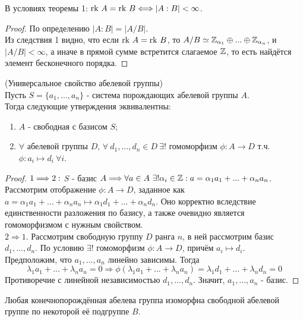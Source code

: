\begin{consequensenum}
    В условиях теоремы 1: $\textup{rk } A = \textup{rk } B \Longleftrightarrow |A : B| < \infty$.
\end{consequensenum}
\begin{proof}
    По определению $|A : B| = |A/B|$. \\
    Из следствия 1 видно, что если $\textup{rk } A = \textup{rk } B$, то $A/B \simeq \mathbb{Z}_{\alpha_1} \oplus ... \oplus \mathbb{Z}_{\alpha_n}$, и $|A/B| < \infty$, а иначе в прямой сумме встретится слагаемое $\mathbb{Z}$, то есть найдётся элемент бесконечного порядка.
\end{proof}
\begin{subtheoremnum}(Универсальное свойство абелевой группы)\\
    Пусть $S = \{a_1,...,a_n\}$ - система порождающих абелевой группы $A$.\\
    Тогда следующие утверждения эквивалентны:
    \begin{enumerate}
        \item $A$ - свободная с базисом $S$;
        \item $\forall$ абелевой группы $D$, $\forall \ d_1,...,d_n \in D \ \exists!$ гомоморфизм $\phi: A\rightarrow D$ т.ч. $\phi: a_i \mapsto d_i \  \forall i$. 
    \end{enumerate} 
\end{subtheoremnum}
\begin{proof}
    $ \\ 1 \Longrightarrow 2:$  $S$ - базис $A \Longrightarrow \forall a \in A \ \exists! \alpha_i  \in \Z : a = \alpha_1a_1 + ... + \alpha_na_n$.\\
    Рассмотрим отображение $\phi: A \rightarrow D$, заданное как $a = \alpha_1a_1 + ... + \alpha_na_n \mapsto \alpha_1d_1 + ... + \alpha_nd_n$. Оно корректно вследствие единственности разложения по базису, а также очевидно является гомоморфизмом с нужным свойством.\\
    $2 \Longrightarrow 1$. Рассмотрим свободную группу $D$ ранга $n$, в ней рассмотрим базис $d_1,...,d_n$. По условию $\exists!$ гомоморфизм $\phi: A \rightarrow D$, причём $a_i \mapsto d_i$.\\
    Предположим, что $a_1,...,a_n$ линейно зависимы. Тогда \[\lambda_1a_1 +...+\lambda_na_n = 0 \Longrightarrow \phi(\lambda_1a_1 +...+\lambda_na_n) = \lambda_1d_1 +...+\lambda_nd_n = 0\] 
    Противоречие с линейной независимостью $d_1,...,d_n$. Значит, $a_1,...,a_n$ - базис.
\end{proof}
\begin{consequensenum}
    Любая конечнопорождённая абелева группа изоморфна свободной абелевой группе по некоторой её подгруппе $B$.
\end{consequensenum}
